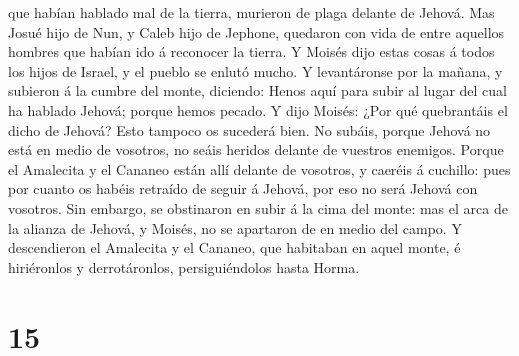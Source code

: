 que habían hablado mal de la tierra, murieron de plaga delante de
Jehová.  Mas Josué hijo de Nun, y Caleb hijo de Jephone,
quedaron con vida de entre aquellos hombres que habían ido á reconocer
la tierra.  Y Moisés dijo estas cosas á todos los hijos de
Israel, y el pueblo se enlutó mucho.  Y levantáronse por la
mañana, y subieron á la cumbre del monte, diciendo: Henos aquí para
subir al lugar del cual ha hablado Jehová; porque hemos pecado.
 Y dijo Moisés: ¿Por qué quebrantáis el dicho de Jehová?
Esto tampoco os sucederá bien.  No subáis, porque Jehová no
está en medio de vosotros, no seáis heridos delante de vuestros
enemigos.  Porque el Amalecita y el Cananeo están allí
delante de vosotros, y caeréis á cuchillo: pues por cuanto os habéis
retraído de seguir á Jehová, por eso no será Jehová con vosotros.
 Sin embargo, se obstinaron en subir á la cima del monte:
mas el arca de la alianza de Jehová, y Moisés, no se apartaron de en
medio del campo.  Y descendieron el Amalecita y el Cananeo,
que habitaban en aquel monte, é hiriéronlos y derrotáronlos,
persiguiéndolos hasta Horma.

\hypertarget{section-14}{%
\section{15}\label{section-14}}

